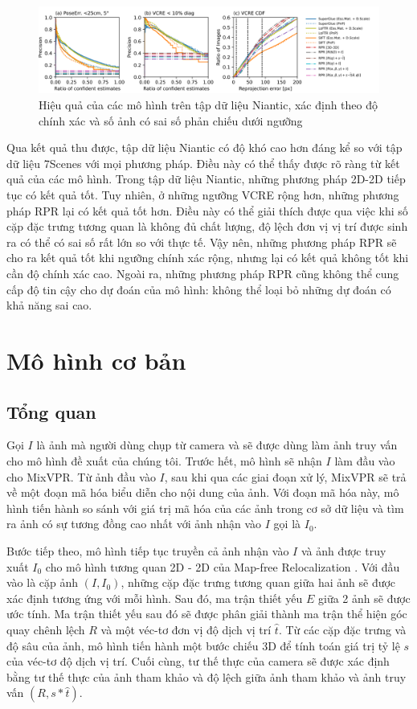 \begin{figure}[H]
  \centering
  \includegraphics[scale=0.5]{pics/Proposal/all_niantic.png}
  \caption{Hiệu quả của các mô hình trên tập dữ liệu Niantic, xác định theo độ chính xác và số ảnh có sai số phản chiếu dưới ngưỡng}
\end{figure}

Qua kết quả thu được, tập dữ liệu Niantic có độ khó cao hơn đáng kể so với tập dữ liệu 7Scenes với mọi phương pháp. Điều này có thể thấy được rõ ràng từ kết quả của các mô hình. Trong tập dữ liệu Niantic, những phương pháp 2D-2D tiếp tục có kết quả tốt. Tuy nhiên, ở những ngưỡng VCRE rộng hơn, những phương pháp RPR lại có kết quả tốt hơn. Điều này có thể giải thích được qua việc khi số cặp đặc trưng tương quan là không đủ chất lượng, độ lệch đơn vị vị trí được sinh ra có thể có sai số rất lớn so với thực tế. Vậy nên, những phương pháp RPR sẽ cho ra kết quả tốt khi ngưỡng chính xác rộng, nhưng lại có kết quả không tốt khi cần độ chính xác cao. Ngoài ra, những phương pháp RPR cũng không thể cung cấp độ tin cậy cho dự đoán của mô hình: không thể loại bỏ những dự đoán có khả năng sai cao.

\section{Mô hình cơ bản}
\subsection{Tổng quan}

Gọi $I$ là ảnh mà người dùng chụp từ camera và sẽ được dùng làm ảnh truy vấn cho mô hình đề xuất của chúng tôi. Trước hết, mô hình sẽ nhận $I$ làm đầu vào cho MixVPR. Từ ảnh đầu vào $I$, sau khi qua các giai đoạn xử lý, MixVPR sẽ trả về một đoạn mã hóa biểu diễn cho nội dung của ảnh. Với đoạn mã hóa này, mô hình tiến hành so sánh với giá trị mã hóa của các ảnh trong cơ sở dữ liệu và tìm ra ảnh có sự tương đồng cao nhất với ảnh nhận vào $I$ gọi là $I_0$.

Bước tiếp theo, mô hình tiếp tục truyền cả ảnh nhận vào $I$ và ảnh được truy xuất $I_0$ cho mô hình tương quan 2D - 2D của Map-free Relocalization \cite{arnold2022mapfree}. Với đầu vào là cặp ảnh $(I, I_0)$, những cặp đặc trưng tương quan giữa hai ảnh sẽ được xác định tương ứng với mỗi hình. Sau đó, ma trận thiết yếu $E$ giữa 2 ảnh sẽ được ước tính. Ma trận thiết yếu sau đó sẽ được phân giải thành ma trận thể hiện góc quay chênh lệch $R$ và một véc-tơ đơn vị độ dịch vị trí $\hat{t}$. Từ các cặp đặc trưng và độ sâu của ảnh, mô hình tiến hành một bước chiếu 3D để tính toán giá trị tỷ lệ $s$ của véc-tơ độ dịch vị trí. Cuối cùng, tư thế thực của camera sẽ được xác định bằng tư thế thực của ảnh tham khảo và độ lệch giữa ảnh tham khảo và ảnh truy vấn $(R,s*\hat{t})$.

